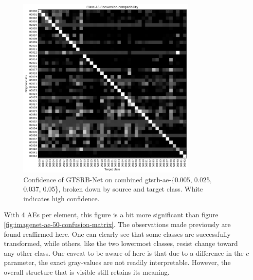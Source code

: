 \documentclass[11pt, a4paper]{article}
\begin{document}
\begin{figure}[h!tb]
	\centering
	\includegraphics[width=0.8\textwidth]{images/confusion-matrices/gtsrb-ae-multiple-0005-0025-0037-005.png}
	\caption[Confidence of GTSRB-Net on GTSRB, by source and target class]{Confidence of GTSRB-Net on combined gtsrb-ae-\{0.005, 0.025, 0.037, 0.05\}, broken down by source and target class. White indicates high confidence.}
	\label{fig:gtsrb-ae-multiple-confusion-matrix}
\end{figure}

With 4 AEs per element, this figure is a bit more significant than figure \ref{fig:imagenet-ae-50-confusion-matrix}. The observations made previously are found reaffirmed here. One can clearly see that some classes are successfully transformed, while others, like the two lowermost classes, resist change toward any other class. One caveat to be aware of here is that due to a difference in the $c$ parameter, the exact gray-values are not readily interpretable. However, the overall structure that is visible still retains its meaning.

\end{document}
